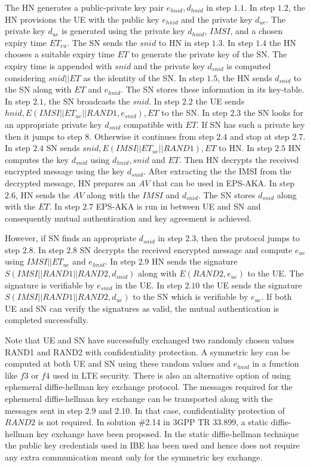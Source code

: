 \documentclass[runningheads,a4paper]{llncs} %
\begin{document}
The HN generates a public-private key pair $e_{hnid},d_{hnid}$ in step $1.1$. In step $1.2$, the HN provisions the UE with the public key $e_{hnid}$ and the private key $d_{ue}$. The private key $d_{ue}$ is generated using the private key $d_{hnid}$, $IMSI$, and a chosen expiry time $ET_{eu}$. The SN sends the $snid$ to HN in step $1.3$. In step $1.4$ the HN chooses a suitable expiry time $ET$ to generate the private key of the SN. The expiry time is appended with $snid$ and the private key $d_{snid}$ is computed considering $snid||ET$ as the identity of the SN. In step $1.5$, the HN sends $d_{snid}$ to the SN along with $ET$ and $e_{hnid}$. The SN stores these information in its key-table. In step $2.1$, the SN broadcasts the $snid$. In step $2.2$ the UE sends $hnid,E(IMSI||ET_{ue}||RAND1,e_{snid}),ET$ to the SN. In step $2.3$ the SN looks for an appropriate private key $d_{snid}$ compatible with $ET$. If SN has such a private key then it jumps to step $8$. Otherwise it continues from step $2.4$ and stop at step $2.7$. In step $2.4$ SN sends $snid,E(IMSI||ET_{ue}||RAND1),ET$ to HN. In step $2.5$ HN computes the key $d_{snid}$ using $d_{hnid},snid$ and $ET$. Then HN decrypts the received encrypted message using the key $d_{snid}$. After extracting the the IMSI from the decrypted message, HN prepares an $AV$ that can be used in EPS-AKA. In step $2.6$, HN sends the $AV$ along with the $IMSI$ and $d_{snid}$. The SN stores $d_{snid}$ along with the $ET$. In step $2.7$ EPS-AKA is run in between UE and SN and consequently mutual authentication and key agreement is achieved.

However, if SN finds an appropriate $d_{snid}$ in step $2.3$, then the protocol jumps to step $2.8$. In step $2.8$ SN decrypts the received encrypted message and compute $e_{ue}$ using $IMSI||ET_{ue}$ and $e_{hnid}$. In step $2.9$ HN sends the signature $S(IMSI||RAND1||RAND2,d_{snid})$ along with $E(RAND2,e_{ue})$ to the UE. The signature is verifiable by $e_{snid}$ in the UE. In step $2.10$ the UE sends the signature $S(IMSI||RAND1||RAND2,d_{ue})$ to the SN which is verifiable by $e_{ue}$. If both UE and SN can verify the signatures as valid, the mutual authentication is completed successfully.

Note that UE and SN have successfully exchanged two randomly chosen values RAND1 and RAND2 with confidentiality protection. A symmetric key can be computed at both UE and SN using these random values and $e_{hnid}$ in a function like $f3$ or $f4$ used in LTE security. There is also an alternative option of using ephemeral diffie-hellman key exchange protocol. The messages required for the ephemeral diffie-hellman key exchange can be transported along with the messages sent in step $2.9$ and $2.10$. In that case, confidentiality protection of $RAND2$ is not required. In solution \#2.14 in 3GPP TR 33.899, a static diffie-hellman key exchange have been proposed. In the static diffie-hellman technique the public key credentials used in IBE has been used and hence does not require any extra communication meant only for the symmetric key exchange.
\end{document}
